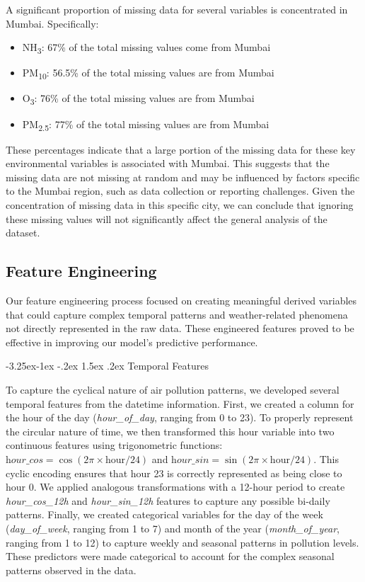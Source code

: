 \documentclass[twoside,11pt]{article}
\makeatletter
\renewcommand\subsubsection{\@startsection{subsubsection}{3}{\z@}%
  {-3.25ex\@plus -1ex \@minus -.2ex}%
  {1.5ex \@plus .2ex}%
  {\normalfont\bfseries\normalsize}}
\makeatother
\begin{document}
A significant proportion of missing data for several variables is concentrated in Mumbai. Specifically:
\begin{itemize}
   \item NH\textsubscript{3}: 67\% of the total missing values come from Mumbai
   \item PM\textsubscript{10}: 56.5\% of the total missing values are from Mumbai
   \item O\textsubscript{3}: 76\% of the total missing values are from Mumbai  
   \item PM\textsubscript{2.5}: 77\% of the total missing values are from Mumbai
\end{itemize}

These percentages indicate that a large portion of the missing data for these key environmental variables is associated with Mumbai. This suggests that the missing data are not missing at random and may be influenced by factors specific to the Mumbai region, such as data collection or reporting challenges. Given the concentration of missing data in this specific city, we can conclude that ignoring these missing values will not significantly affect the general analysis of the dataset.


\subsection{Feature Engineering}

Our feature engineering process focused on creating meaningful derived variables that could capture complex temporal patterns and weather-related phenomena not directly represented in the raw data. These engineered features proved to be effective in improving our model's predictive performance.

\subsubsection{Temporal Features}

To capture the cyclical nature of air pollution patterns, we developed several temporal features from the datetime information. First, we created a column for the hour of the day (\textit{hour\_of\_day}, ranging from 0 to 23). To properly represent the circular nature of time, we then transformed this hour variable into two continuous features using trigonometric functions: $\textit{hour\_cos} = \cos(2\pi \times \text{hour}/24)$ and $\textit{hour\_sin} = \sin(2\pi \times \text{hour}/24)$. This cyclic encoding ensures that hour 23 is correctly represented as being close to hour 0. We applied analogous transformations with a 12-hour period to create \textit{hour\_cos\_12h} and \textit{hour\_sin\_12h} features to capture any possible bi-daily patterns. Finally, we created categorical variables for the day of the week (\textit{day\_of\_week}, ranging from 1 to 7) and month of the year (\textit{month\_of\_year}, ranging from 1 to 12) to capture weekly and seasonal patterns in pollution levels. These predictors were made categorical to account for the complex seasonal patterns observed in the data.
\end{document}
